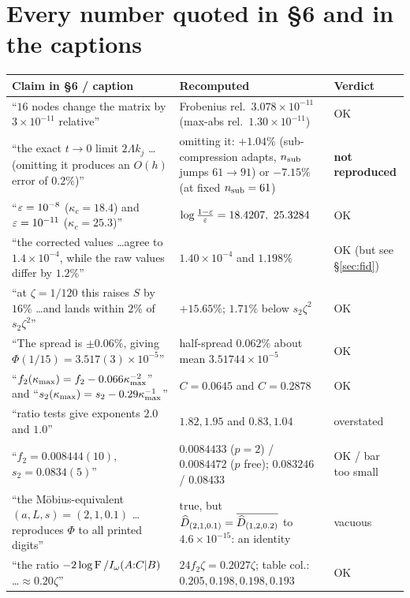 \documentclass[11pt]{article}
\newcommand{\kc}{\kappa_c}
\begin{document}
\section[Every number quoted in Section 6 and in the captions]{Every number quoted in \S6 and in the captions}\label{sec:numbers}

\begin{center}\small
\begin{tabular}{p{}p{}p{}}\toprule
Claim in \S6 / caption & Recomputed & Verdict\\\midrule
``$16$ nodes change the matrix by $3\times10^{-11}$ relative''
 & Frobenius rel.\ $3.078\times10^{-11}$ (max-abs rel.\ $1.30\times10^{-11}$) & OK\\
``the exact $t\to0$ limit $2\Lambda k_j$ \dots (omitting it produces an $O(h)$ error of $0.2\%$)''
 & omitting it: $+1.04\%$ (sub-compression adapts, $n_{\rm sub}$ jumps $61\to91$) or $-7.15\%$ (at
 fixed $n_{\rm sub}=61$) & \textbf{not reproduced}\\
``$\varepsilon=10^{-8}$ ($\kc=18.4$) and $\varepsilon=10^{-11}$ ($\kc=25.3$)''
 & $\log\frac{1-\eps}\eps=18.4207,\ 25.3284$ & OK\\
``the corrected values \dots agree to $1.4\times10^{-4}$, while the raw values differ by $1.2\%$''
 & $1.40\times10^{-4}$ and $1.198\%$ & OK (but see \S\ref{sec:fid})\\
``at $\zeta=1/120$ this raises $S$ by $16\%$ \dots and lands within $2\%$ of $s_2\zeta^2$''
 & $+15.65\%$; $1.71\%$ below $s_2\zeta^2$ & OK\\
``The spread is $\pm0.06\%$, giving $\Phi(1/15)=3.517(3)\times10^{-5}$''
 & half-spread $0.062\%$ about mean $3.51744\times10^{-5}$ & OK\\
``$f_2(\kappa_{\max})=f_2-0.066\kappa_{\max}^{-2}$'' and ``$s_2(\kappa_{\max})=s_2-0.29\kappa_{\max}^{-1}$''
 & $C=0.0645$ and $C=0.2878$ & OK\\
``ratio tests give exponents $2.0$ and $1.0$''
 & $1.82,1.95$ and $0.83,1.04$ & overstated\\
``$f_2=0.008444(10)$, $s_2=0.0834(5)$''
 & $0.0084433$ ($p{=}2$) / $0.0084472$ ($p$ free); $0.083246$ / $0.08433$ & OK / bar too small\\
``the M\"obius-equivalent $(a,L,s)=(2,1,0.1)$ \dots reproduces $\Phi$ to all printed digits''
 & true, but $\widehat D_{(2,1,0.1)}=\overline{\widehat D_{(1,2,0.2)}}$ to $4.6\times10^{-15}$: an identity & vacuous\\
``the ratio $-2\log\operatorname{F}/I_\omega(A{:}C|B)$ \dots $\approx0.20\zeta$''
 & $24f_2\zeta=0.2027\zeta$; table col.: $0.205,0.198,0.198,0.193$ & OK\\

\end{tabular}
\end{center}
\end{document}
